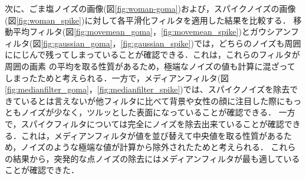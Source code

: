 \documentclass[11pt,a4paper]{ltjsarticle}
\begin{document}
   次に、ごま塩ノイズの画像(図\ref{fig:woman-goma})および，スパイクノイズの画像(図\ref{fig:woman_spike})に対して各平滑化フィルタを適用した結果を比較する．
   移動平均フィルタ(図\ref{fig:movemean_goma}，\ref{fig:movemean_spike})とガウシアンフィルタ(図\ref{fig:gaussian_goma}，\ref{fig:gaussian_spike})では，どちらのノイズも周囲ににじんで残ってしまっていることが確認できる．これは，これらのフィルタが周囲の画素
   の平均を取る性質があるため，極端なノイズの値も計算に混ざってしまったためと考えられる．一方で，メディアンフィルタ(図\ref{fig:medianfilter_goma}，\ref{fig:medianfilter_spike})では、スパイクノイズを除去できているとは言えないが他フィルタに比べて背景や女性の顔に注目した際にもっともノイズが少なく，ツルッとした表面になっていることが確認できる．
   一方で，スパイクフィルタについては完全にノイズを除去出来ていることが確認できる．これは，メディアンフィルタが値を並び替えて中央値を取る性質があるため，ノイズのような極端な値が計算から除外されたためと考えられる．
   これらの結果から，突発的な点ノイズの除去にはメディアンフィルタが最も適していることが確認できた．
\end{document}

